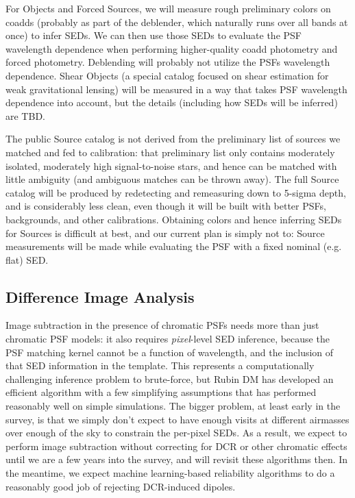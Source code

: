 \documentclass[DM,authoryear,toc]{lsstdoc}
\begin{document}
For Objects and Forced Sources, we will measure rough preliminary colors on coadds (probably as part of the deblender, which naturally runs over all bands at once) to infer SEDs.
We can then use those SEDs to evaluate the PSF wavelength dependence when performing higher-quality coadd photometry and forced photometry.
Deblending will probably not utilize the PSFs wavelength dependence.
Shear Objects (a special catalog focused on shear estimation for weak gravitational lensing) will be measured in a way that takes PSF wavelength dependence into account, but the details (including how SEDs will be inferred) are TBD.

The public Source catalog is not derived from the preliminary list of sources we matched and fed to calibration: that preliminary list only contains moderately isolated, moderately high signal-to-noise stars, and hence can be matched with little ambiguity (and ambiguous matches can be thrown away).
The full Source catalog will be produced by redetecting and remeasuring down to 5-sigma depth, and is considerably less clean, even though it will be built with better PSFs, backgrounds, and other calibrations.
Obtaining colors and hence inferring SEDs for Sources is difficult at best, and our current plan is simply not to: Source measurements will be made while evaluating the PSF with a fixed nominal (e.g. flat) SED.

\subsection{Difference Image Analysis}


Image subtraction in the presence of chromatic PSFs needs more than just chromatic PSF models: it also requires \emph{pixel}-level SED inference, because the PSF matching kernel cannot be a function of wavelength, and the inclusion of that SED information in the template.
This represents a computationally challenging inference problem to brute-force, but Rubin DM has developed an efficient algorithm with a few simplifying assumptions \citep{DMTN-037, DMTN-121} that has performed reasonably well on simple simulations.
The bigger problem, at least early in the survey, is that we simply don't expect to have enough visits at different airmasses over enough of the sky to constrain the per-pixel SEDs.
As a result, we expect to perform image subtraction without correcting for DCR or other chromatic effects until we are a few years into the survey, and will revisit these algorithms then.
In the meantime, we expect machine learning-based reliability algorithms to do a reasonably good job of rejecting DCR-induced dipoles.
\end{document}
